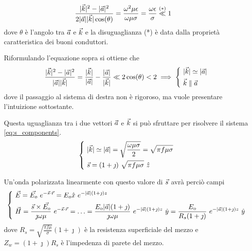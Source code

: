 		\begin{equation*} \begin{split}
			& \frac{|\vec{k}|^2 - |\vec{a}|^2}{2 |\vec{a}| |\vec{k}| \cos(\theta)}
				= \frac{\omega^2 \mu \epsilon}{\omega \mu \sigma}
				= \frac{\omega \epsilon}{\sigma} \stackrel{(*)}{\ll} 1
		\end{split} \end{equation*}
		dove $\theta$ è l'angolo tra $\vec{a}$ e $\vec{k}$ e la disuguaglianza (*) è data dalla proprietà caratteristica dei buoni conduttori.

		Riformulando l'equazione sopra si ottiene che
		\begin{equation*}
			\frac{|\vec{k}|^2 - |\vec{a}|^2}{|\vec{a}| |\vec{k}|}
				= \frac{|\vec{k}|}{|\vec{a}|} - \frac{|\vec{a}|}{|\vec{k}|}
				\ll 2 \cos(\theta) < 2 \implies
				\begin{dcases}
					~ |\vec{k}| \simeq |\vec{a}| \\
					~ \vec{k} \parallel \vec{a}
				\end{dcases}
		\end{equation*}
		dove il passaggio al sistema di destra non è rigoroso, ma vuole presentare l'intuizione sottostante.

		Questa uguaglianza tra i due vettori $\vec{a}$ e $\vec{k}$ si può sfruttare per risolvere il sistema \ref{eq:s_components}.
		\begin{equation*}
			\begin{dcases}
				~ |\vec{k}| \simeq |\vec{a}|
					= \sqrt{\frac{\omega \mu \sigma}{2}}
					= \sqrt{\pi f \mu \sigma} \\
				~ \vec{s} = (1 + \jmath) ~ \sqrt{\pi f \mu \sigma} ~ \hat{z} \\
			\end{dcases}
		\end{equation*}

		Un'onda polarizzata linearmente con questo valore di $\vec{s}$ avrà perciò campi
		\begin{equation*}
			\begin{dcases}
				~ \vec{E} = \vec{E_o} ~ e^{-\vec{s} \cdot \vec{r}} = E_o \hat{x} ~ e^{-|\vec{a}| (1 + \jmath) z} \\
				~ \vec{H} = \frac{\vec{s} \times \vec{E_o}}{\jmath \omega \mu} ~ e^{-\vec{s} \cdot \vec{r}}
					= \ldots = \frac{E_o |\vec{a}| (1 + \jmath)}{\jmath \omega \mu} ~ e^{-|\vec{a}| (1 + \jmath) z} ~ \hat{y}
					= \frac{E_o}{ R_s (1 + \jmath) } ~ e^{-|\vec{a}| (1 + \jmath) z} ~ \hat{y}
			\end{dcases}
		\end{equation*}
		dove $R_s = \sqrt{\frac{\pi f \mu}{\sigma}} (1 + \jmath)$ è la resistenza superficiale del mezzo e $Z_w = (1 + \jmath) R_s$ è l'impedenza di parete del mezzo.

